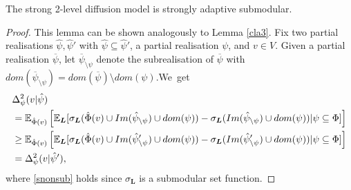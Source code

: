 \begin{lemma}\label{scla3}
The strong 2-level diffusion model is strongly adaptive submodular. 
\end{lemma}
\begin{proof}
This lemma can be shown analogously to Lemma \ref{cla3}. Fix two partial realisations $\hat{\psi},\hat{\psi}'$ with $\hat{\psi}\subseteq \hat{\psi}'$, a partial realisation $\psi$, and $v\in V$.  Given a partial realisation $\overline{\psi}$, let $\overline{\psi}_{\setminus \psi}$ denote the subrealisation of $\overline{\psi}$ with $dom(\overline{\psi}_{\setminus \psi})=dom(\overline{\psi})\setminus dom(\psi)$.We~get
\begin{align}
&{\Delta}_{\psi}^2(v|\hat{\psi})\nonumber\\
&=\mathbb{E}_{\hat{\Phi}(v)}\left[\mathbb{E}_{\bm L}[\sigma_{\bm L}(\hat{\Phi}(v)\cup Im(\hat{\psi}_{\setminus \psi})\cup dom(\psi))-\sigma_{\bm L}(Im(\hat{\psi}_{\setminus \psi})\cup dom(\psi))|\psi\subseteq \Phi]\right]\nonumber\\
&\geq \mathbb{E}_{\hat{\Phi}(v)}\left[\mathbb{E}_{\bm L}[\sigma_{\bm L}(\hat{\Phi}(v)\cup Im(\hat{\psi}'_{\setminus \psi})\cup dom(\psi))-\sigma_{\bm L}(Im(\hat{\psi}'_{\setminus \psi})\cup dom(\psi))|\psi\subseteq \Phi]\right]\label{snonsub}\\
&=\Delta^2_\psi(v|\hat{\psi}'),\nonumber
\end{align}
where \eqref{snonsub} holds since $\sigma_{\bm L}$ is a submodular set function. 
\end{proof}


